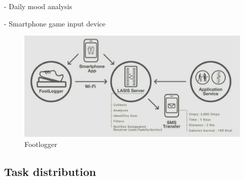\documentclass[conference]{IEEEtran}
\begin{document}
-  Daily mood analysis

-  Smartphone game input device\\

\begin{figure}[htbp]
\begin{center}
    \includegraphics[scale=0.33]{img_05.jpg}
    \caption{Footlogger} 
\end{center}
\end{figure}

\subsection{Task distribution\\\\\\}

\renewcommand{\arrayrulewidth}{1pt}


\end{document}
